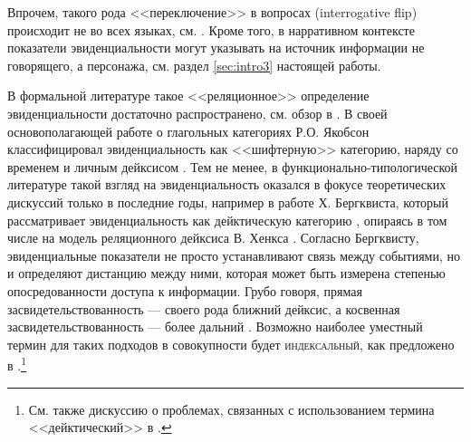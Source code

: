     

Впрочем, такого рода <<переключение>> в вопросах (interrogative flip) происходит не во всех языках, см. \citep[43--50]{murray2017}. Кроме того, в нарративном контексте показатели эвиденциальности могут указывать на источник информации не говорящего, а персонажа, см. раздел \ref{sec:intro3} настоящей работы.
\par В формальной литературе такое <<реляционное>> определение эвиденциальности достаточно распространено, см. обзор в \citep{speas2018}. В своей основополагающей работе о глагольных категориях Р.О. Якобсон классифицировал эвиденциальность как <<шифтерную>> категорию, наряду со временем и личным дейксисом \citep{jakobson1957}. Тем не менее, в функционально-типологической литературе такой взгляд на эвиденциальность оказался в фокусе теоретических дискуссий только в последние годы, например в работе Х. Бергквиста, который рассматривает эвиденциальность как дейктическую категорию \citep{bergqvist2018}, опираясь в том числе на модель реляционного дейксиса В. Хенкса \citep[12]{hanks2009}. Согласно Бергквисту, эвиденциальные показатели не просто устанавливают связь между событиями, но и определяют дистанцию между ними, которая может быть измерена степенью опосредованности доступа к информации. Грубо говоря, прямая засвидетельствованность --- своего рода ближний дейксис, а косвенная засвидетельствованность --- более дальний \citep[21--23]{bergqvist2018}. Возможно наиболее уместный термин для таких подходов в совокупности будет \textsc{индексальный}, как предложено в \citep{hanks2014}.\footnote{См. также дискуссию о проблемах, связанных с использованием термина <<дейктический>> в \citep[265--267]{boye2018}.}

